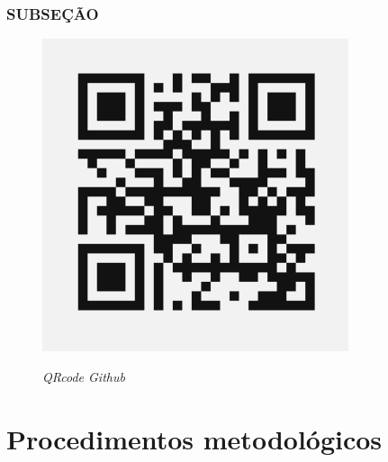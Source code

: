 \documentclass{unemat-tex}
\begin{document}
	
		\subsection{SUBSEÇÃO}
		
			\begin{figure}[h]
			\caption{\label{Debian}\textit{QRcode Github}}
			\centering
			{\includegraphics[width=9cm]{Imagens/Karan_GitHub.png}}
			\end{figure}
	

	
\chapter{Procedimentos metodológicos}
	
	
\end{document}
